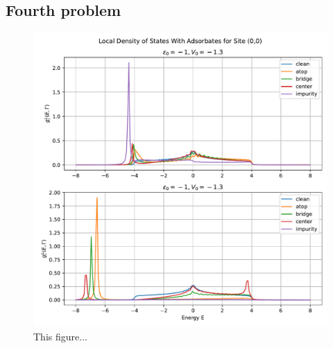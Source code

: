 \subsection{Fourth problem}

\begin{figure}[H]
    \centering    \includegraphics[width=\textwidth]{Figures/task4.pdf}
    \caption{This figure...}
    \label{fig:task4}
\end{figure}